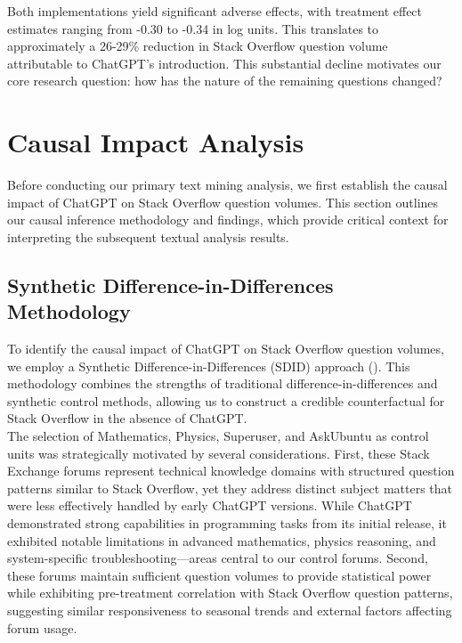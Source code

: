 Both implementations yield significant adverse effects, with treatment effect estimates ranging from -0.30 to -0.34 in log units. This translates to approximately a 26-29\% reduction in Stack Overflow question volume attributable to ChatGPT's introduction. This substantial decline motivates our core research question: how has the nature of the remaining questions changed?




\section{Causal Impact Analysis}
Before conducting our primary text mining analysis, we first establish the causal impact of ChatGPT on Stack Overflow question volumes. This section outlines our causal inference methodology and findings, which provide critical context for interpreting the subsequent textual analysis results.

\subsection{Synthetic Difference-in-Differences Methodology}
To identify the causal impact of ChatGPT on Stack Overflow question volumes, we employ a Synthetic Difference-in-Differences (SDID) approach (\cite{arkhangelsky_synthetic_2021}). This methodology combines the strengths of traditional difference-in-differences and synthetic control methods, allowing us to construct a credible counterfactual for Stack Overflow in the absence of ChatGPT.\\

The selection of Mathematics, Physics, Superuser, and AskUbuntu as control units was strategically motivated by several considerations. First, these Stack Exchange forums represent technical knowledge domains with structured question patterns similar to Stack Overflow, yet they address distinct subject matters that were less effectively handled by early ChatGPT versions. While ChatGPT demonstrated strong capabilities in programming tasks from its initial release, it exhibited notable limitations in advanced mathematics, physics reasoning, and system-specific troubleshooting—areas central to our control forums. Second, these forums maintain sufficient question volumes to provide statistical power while exhibiting pre-treatment correlation with Stack Overflow question patterns, suggesting similar responsiveness to seasonal trends and external factors affecting forum usage.\\

